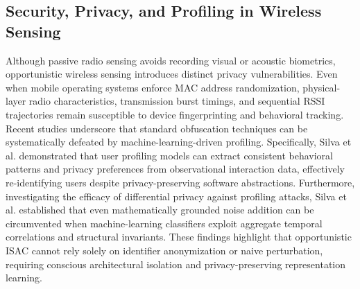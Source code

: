 \subsection{Security, Privacy, and Profiling in Wireless Sensing}
Although passive radio sensing avoids recording visual or acoustic biometrics, opportunistic wireless sensing introduces distinct privacy vulnerabilities. Even when mobile operating systems enforce MAC address randomization, physical-layer radio characteristics, transmission burst timings, and sequential \ac{RSSI} trajectories remain susceptible to device fingerprinting and behavioral tracking. Recent studies underscore that standard obfuscation techniques can be systematically defeated by machine-learning-driven profiling. Specifically, Silva et al. \cite{silva2025iknow} demonstrated that user profiling models can extract consistent behavioral patterns and privacy preferences from observational interaction data, effectively re-identifying users despite privacy-preserving software abstractions. Furthermore, investigating the efficacy of differential privacy against profiling attacks, Silva et al. \cite{silva2025evaluatingdp} established that even mathematically grounded noise addition can be circumvented when machine-learning classifiers exploit aggregate temporal correlations and structural invariants. These findings highlight that opportunistic ISAC cannot rely solely on identifier anonymization or naive perturbation, requiring conscious architectural isolation and privacy-preserving representation learning.
